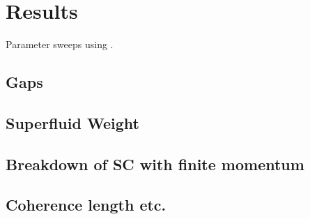 \documentclass[../notes.tex]{subfiles}
\begin{document}
	
\chapter{Results}

Parameter sweeps using \cite{bachParasweepTemplatebasedUtility2021}.

\section{Gaps}

\section{Superfluid Weight}

\section{Breakdown of SC with finite momentum}

\section{Coherence length etc.}
	
\end{document}
